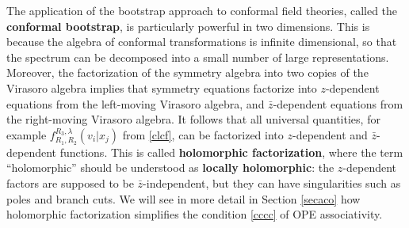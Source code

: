 \documentclass[12pt, a4paper, notitlepage, twoside]{report}
\numberwithin{equation}{section}
\theoremstyle{break}
\begin{document}
The application of the bootstrap approach to conformal field theories, called the \textbf{conformal bootstrap}, 
is particularly powerful in two dimensions.
This is because the algebra of conformal transformations is infinite dimensional, 
so that the spectrum can be decomposed into a small number of large representations.
Moreover, the factorization of the symmetry algebra into two copies of the Virasoro algebra 
implies that symmetry equations factorize into $z$-dependent equations from the left-moving Virasoro algebra, and $\bar{z}$-dependent equations from the right-moving Virasoro algebra.
It follows that all universal quantities, for example $f_{R_1,R_2}^{R_3,\lambda}(v_i|x_j)$ from \eqref{clcf}, can be factorized into $z$-dependent and $\bar{z}$-dependent functions. 
This is called \textbf{\boldmath holomorphic factorization}, where the term ``holomorphic''
should be understood as \textbf{\boldmath locally holomorphic}: the $z$-dependent factors are supposed to be $\bar{z}$-independent, but they can have singularities such as poles and branch cuts.
We will see in more detail in Section \ref{secaco} how holomorphic factorization simplifies the condition \eqref{cccc} of OPE associativity.
\end{document}
